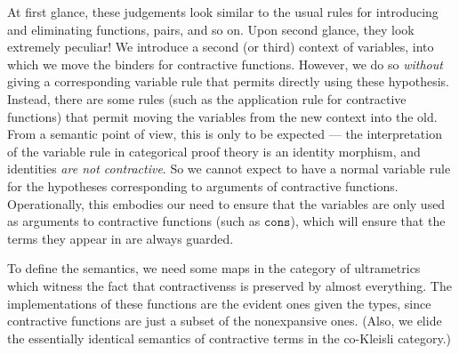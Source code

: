 \documentclass[nocopyrightspace,preprint]{sigplanconf}
\newcommand{\term}[1]{\ensuremath{\mathtt{{#1}}}}
\begin{document}
At first glance, these judgements look similar to the usual rules for
introducing and eliminating functions, pairs, and so on. Upon second
glance, they look extremely peculiar! We introduce a second (or third)
context of variables, into which we move the binders for contractive
functions. However, we do so \emph{without} giving a corresponding
variable rule that permits directly using these hypothesis. Instead,
there are some rules (such as the application rule for contractive
functions) that permit moving the variables from the new context into
the old. From a semantic point of view, this is only to be expected ---
the interpretation of the variable rule in categorical proof theory is
an identity morphism, and identities \emph{are not contractive}. So we
cannot expect to have a normal variable rule for the hypotheses
corresponding to arguments of contractive functions. Operationally,
this embodies our need to ensure that the variables are only used as
arguments to contractive functions (such as \term{cons}), which will
ensure that the terms they appear in are always guarded.

To define the semantics, we need some maps in the category of
ultrametrics which witness the fact that contractivenss is preserved
by almost everything. The implementations of these functions are the
evident ones given the types, since contractive functions are just a
subset of the nonexpansive ones. (Also, we elide the essentially
identical semantics of contractive terms in the co-Kleisli category.)
\end{document}
